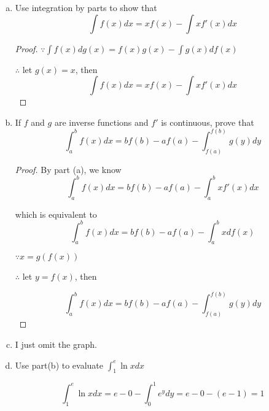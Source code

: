 \documentclass{article}
\begin{document}
    \begin{enumerate}[(a)]
        \item Use integration by parts to show that $$\int f(x) dx = xf(x) - \int x f'(x) dx$$

        \begin{proof}

            $\because \int f(x) d g(x) = f(x)g(x) - \int g(x) d f(x)$

            $\therefore $ let $g(x) = x$, then $$\int f(x) dx = xf(x) - \int x f'(x) dx$$
        \end{proof}

        \item If $f$ and $g$ are inverse functions and $f'$ is continuous, prove that $$\int_a^b f(x) dx = bf(b) - af(a) - \int_{f(a)}^{f(b)} g(y) dy$$

        \begin{proof}

            By part (a), we know $$\int_a^b f(x) dx = bf(b) - af(a) - \int_a^b xf'(x) dx$$

            which is equivalent to $$\int_a^b f(x) dx = bf(b) - af(a) - \int_a^b x d f(x)$$

            $\because x = g(f(x))$
            
            $\therefore $ let $y = f(x)$, then 

            $$\int_a^b f(x) dx = bf(b) - af(a) - \int_{f(a)}^{f(b)} g(y) dy$$
        \end{proof}

        \item I just omit the graph.
        \item Use part(b) to evaluate $\int_1^e \ln x dx$

        $$\int_1^e \ln x dx = e - 0 - \int_0^1 e^y dy = e - 0 - (e - 1) = 1$$
    \end{enumerate}
\end{document}
